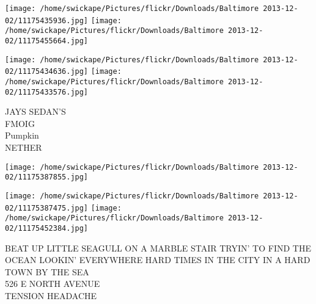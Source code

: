\documentclass[10pt,letterpaper]{article}
\begin{document}
\texttt{[image: /home/swickape/Pictures/flickr/Downloads/Baltimore 2013-12-02/11175435936.jpg]}
\texttt{[image: /home/swickape/Pictures/flickr/Downloads/Baltimore 2013-12-02/11175455664.jpg]}

\texttt{[image: /home/swickape/Pictures/flickr/Downloads/Baltimore 2013-12-02/11175434636.jpg]}
\texttt{[image: /home/swickape/Pictures/flickr/Downloads/Baltimore 2013-12-02/11175433576.jpg]}

JAYS SEDAN'S\\
FMOIG\\
Pumpkin\\
NETHER
\pagebreak

\texttt{[image: /home/swickape/Pictures/flickr/Downloads/Baltimore 2013-12-02/11175387855.jpg]}

\vspace{0.25in}
\texttt{[image: /home/swickape/Pictures/flickr/Downloads/Baltimore 2013-12-02/11175387475.jpg]}
\texttt{[image: /home/swickape/Pictures/flickr/Downloads/Baltimore 2013-12-02/11175452384.jpg]}

BEAT UP LITTLE SEAGULL ON A MARBLE STAIR TRYIN' TO FIND THE OCEAN LOOKIN' EVERYWHERE HARD TIMES IN THE CITY IN A HARD TOWN BY THE SEA\\
526 E NORTH AVENUE\\
TENSION HEADACHE
\pagebreak
\end{document}
